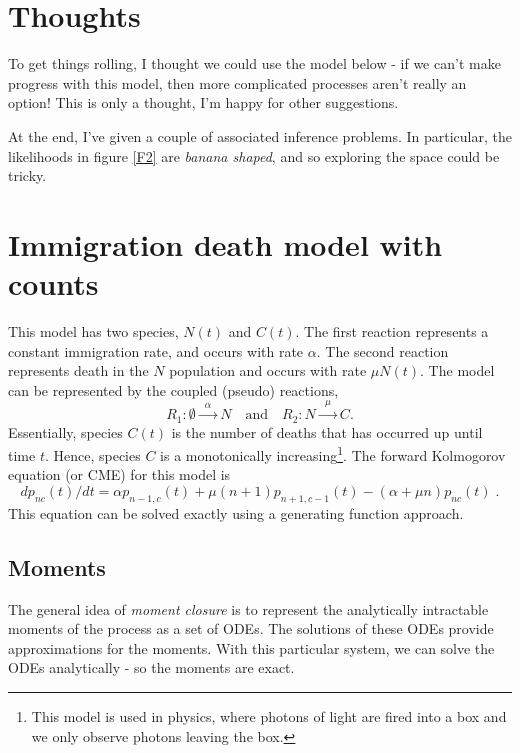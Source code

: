 \documentclass[11pt,BCOR2mm,DIV14]{scrartcl}
\begin{document}
\section*{Thoughts}

To get things rolling, I thought we could use the model below - if we can't make progress with this model, then more complicated processes aren't really an option! This is only a thought, I'm happy for other suggestions.

At the end, I've given a couple of associated inference problems. In particular, the likelihoods in figure \ref{F2} are \textit{banana shaped}, and so exploring the space could be tricky. 

\section*{Immigration death model with counts}

This model has two species, $N(t)$ and $C(t)$. The first reaction represents a constant immigration rate, and occurs with rate $\alpha$. The second reaction represents death in the $N$ population and occurs with rate $\mu N(t)$. The model can be represented by the coupled (pseudo) reactions, 
\begin{equation}\label{1}
R_1: \emptyset  \xrightarrow{\phantom{a}\alpha\phantom{a}} N 
\quad \text{and} \quad
R_2: N  \xrightarrow{\phantom{a}\mu\phantom{a}} C .
\end{equation}
Essentially, species $C(t)$ is the number of deaths that has occurred up until time $t$. Hence, species $C$ is a monotonically increasing\footnote{This model is used in physics, where photons of light are fired into a box and we only observe photons leaving the box.}. The forward Kolmogorov equation (or CME) for this model is
\[
dp_{nc}(t)/dt = \alpha p_{n-1, c}(t) +  \mu (n+1) p_{n+1,c-1}(t) 
- (\alpha + \mu n) p_{nc}(t) \;.
\]
This equation can be solved exactly using a generating function approach.

\subsection*{Moments}

The general idea of \textit{moment closure} is to represent the analytically intractable moments of the process as a set of ODEs. The solutions of these ODEs provide approximations for the moments. With this particular system, we can solve the ODEs analytically - so the moments are exact.
\end{document}
